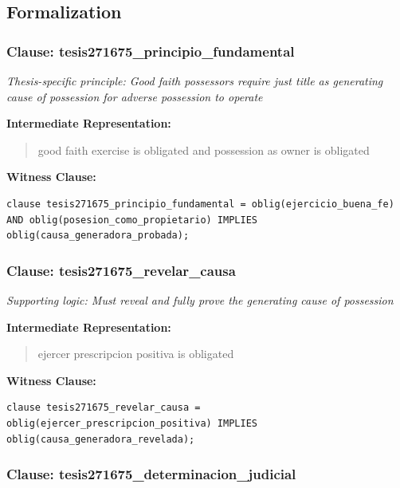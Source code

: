 \documentclass[11pt,a4paper]{article}
\begin{document}
\subsection{Formalization}

\subsubsection{Clause: tesis271675\_principio\_fundamental}

\textit{Thesis-specific principle: Good faith possessors require just title as generating cause of possession for adverse possession to operate}

\textbf{Intermediate Representation:}

\begin{quote}
good faith exercise is obligated and possession as owner is obligated
\end{quote}

\textbf{Witness Clause:}

\begin{lstlisting}[style=witnessstyle, language=Witness]
clause tesis271675_principio_fundamental = oblig(ejercicio_buena_fe) AND oblig(posesion_como_propietario) IMPLIES oblig(causa_generadora_probada);
\end{lstlisting}

\subsubsection{Clause: tesis271675\_revelar\_causa}

\textit{Supporting logic: Must reveal and fully prove the generating cause of possession}

\textbf{Intermediate Representation:}

\begin{quote}
ejercer prescripcion positiva is obligated
\end{quote}

\textbf{Witness Clause:}

\begin{lstlisting}[style=witnessstyle, language=Witness]
clause tesis271675_revelar_causa = oblig(ejercer_prescripcion_positiva) IMPLIES oblig(causa_generadora_revelada);
\end{lstlisting}

\subsubsection{Clause: tesis271675\_determinacion\_judicial}
\end{document}
